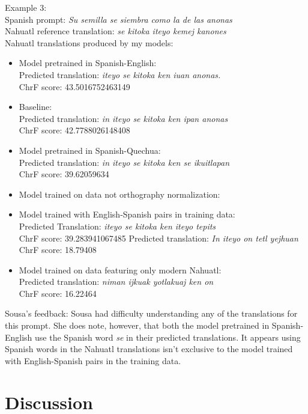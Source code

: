 \documentclass[10pt,twocolumn]{article}
\begin{document}
Example 3: \\
    Spanish prompt: \textit{Su semilla se siembra como la de las anonas} \\
    Nahuatl reference translation: \textit{se kitoka iteyo kemej kanones} \\
    Nahuatl translations produced by my models: \\
\begin{itemize}
      \item Model pretrained in Spanish-English: \\ 
    Predicted translation: \textit{iteyo se kitoka ken iuan anonas.} \\ ChrF score: 43.5016752463149
    \item Baseline: \\ 
    Predicted translation: \textit{in iteyo se kitoka ken ipan anonas} \\ ChrF score: 42.7788026148408
     \item Model pretrained in Spanish-Quechua: \\
    Predicted translation: \textit{in iteyo se kitoka ken se ikuitlapan} \\ ChrF score: 39.62059634
    \item Model trained on data not orthography normalization: \\ 
    \item Model trained with  English-Spanish pairs in training data: \\ 
    Predicted Translation: \textit{iteyo se kitoka ken iteyo tepits} \\ ChrF score: 39.283941067485
    Predicted translation: \textit{In iteyo on tetl yejhuan} \\ ChrF score: 18.79408
    \item Model trained on data featuring only modern Nahuatl: \\ 
    Predicted translation: \textit{niman ijkuak yotlakuaj ken on} \\ ChrF score: 16.22464
\end{itemize}

Sousa's feedback:
Sousa had difficulty understanding any of the translations for this prompt. She does note, however, that both the model pretrained in Spanish-English use the Spanish word \textit{se} in their predicted translations. It appears using Spanish words in the Nahuatl translations isn't exclusive to the model trained with English-Spanish pairs in the training data.

\section{Discussion}
\end{document}

